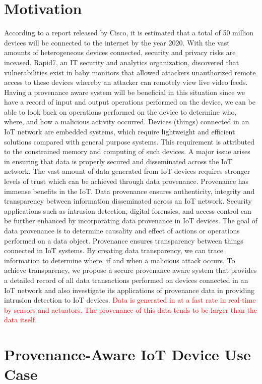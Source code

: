 \section{Motivation}
According to a report released by Cisco, it is estimated that a total of 50 million devices will be
connected to the internet by the year 2020. With the vast amounts of heterogeneous devices connected,
security and privacy risks are inceased. Rapid7, an  IT security and analytics organization, discovered that vulnerabilities exist in
baby monitors that allowed attackers unauthorized remote access to these devices
whereby an attacker can remotely view live video feeds. Having a provenance aware
system will be beneficial in this situation since we have a record of input and output
operations performed on the device, we can be able to look back on operations
performed on the device to determine who, where, and how a malicious activity
occurred. Devices (things) connected in an IoT network are embedded systems, which
require lightweight and efficient solutions compared with general purpose
systems.
This requirement is attributed to the constrained memory and computing of such
devices. A major issue arises in ensuring that data is properly secured and
disseminated across the IoT network. The vast amount of data generated from IoT
devices requires stronger levels of trust which can be achieved through data
provenance. Provenance has immense benefits in the IoT. Data provenance ensures
authenticity, integrity and transparency between information disseminated across an
IoT network. Security applications such as intrusion detection, digital forensics, and
access control can be further enhanced by incorporating data provenance in IoT
devices. The goal of data provenance is to determine causality and effect of actions or
operations performed on a data object. Provenance ensures transparency between things
connected in IoT systems. By creating data transparency, we can trace information to
determine where, if and when a malicious attack occurs. To achieve transparency, we
propose a secure provenance aware system that provides a detailed record of all data
transactions performed on devices connected in an IoT network and also investigate its applications of provenance data in providing intrusion detection to IoT devices.  \textcolor{red}{Data is generated in at a fast rate in real-time by sensors and actuators. The provenance of this data tends to be larger than the data itself.}

\section{Provenance-Aware IoT Device Use Case}

